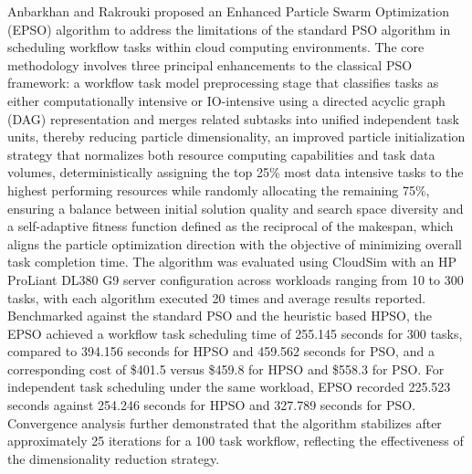 \documentclass[pdflatex,sn-mathphys-num]{sn-jnl}%
\theoremstyle{thmstyleone}%
\theoremstyle{thmstyletwo}%
\theoremstyle{thmstylethree}%
\begin{document}
Anbarkhan and Rakrouki \cite{Anbarkhan2023AnEP} proposed an Enhanced Particle Swarm Optimization (EPSO) algorithm to address the limitations of the standard PSO algorithm in scheduling workflow tasks within cloud computing environments. The core methodology involves three principal enhancements to the classical PSO framework: a workflow task model preprocessing stage that classifies tasks as either computationally intensive or IO-intensive using a directed acyclic graph (DAG) representation and merges related subtasks into unified independent task units, thereby reducing particle dimensionality, an improved particle initialization strategy that normalizes both resource computing capabilities and task data volumes, deterministically assigning the top 25\% most data intensive tasks to the highest performing resources while randomly allocating the remaining 75\%, ensuring a balance between initial solution quality and search space diversity and a self-adaptive fitness function defined as the reciprocal of the makespan, which aligns the particle optimization direction with the objective of minimizing overall task completion time. The algorithm was evaluated using CloudSim with an HP ProLiant DL380 G9 server configuration across workloads ranging from 10 to 300 tasks, with each algorithm executed 20 times and average results reported. Benchmarked against the standard PSO and the heuristic based HPSO, the EPSO achieved a workflow task scheduling time of 255.145 seconds for 300 tasks, compared to 394.156 seconds for HPSO and 459.562 seconds for PSO, and a corresponding cost of \$401.5 versus \$459.8 for HPSO and \$558.3 for PSO. For independent task scheduling under the same workload, EPSO recorded 225.523 seconds against 254.246 seconds for HPSO and 327.789 seconds for PSO. Convergence analysis further demonstrated that the algorithm stabilizes after approximately 25 iterations for a 100 task workflow, reflecting the effectiveness of the dimensionality reduction strategy.
\end{document}
